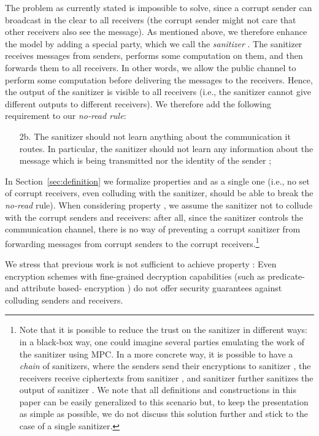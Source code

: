 \documentclass{llncs}
\begin{document}
The problem as currently stated is impossible to solve, since a corrupt sender can broadcast  in the clear to all receivers (the corrupt sender might not care that other receivers also see the message). As mentioned above, we therefore enhance the model by adding a special party, which we call the \emph{sanitizer} . The sanitizer receives messages from senders, performs some computation on them, and then forwards them to all receivers. 
In other words, we allow the public channel to perform some computation before delivering the messages to the receivers. Hence, the output of the sanitizer is visible to all receivers (i.e., the sanitizer cannot give different outputs to different receivers). 
We therefore add the following requirement to our \emph{no-read rule}:
\begin{enumerate}
\item[2b.] The sanitizer should not learn anything about the communication it routes. In particular, the sanitizer should not learn any information about the message  which is being transmitted nor the identity of the sender ; 
\end{enumerate}

In Section~\ref{sec:definition} we formalize properties  and  as a single one (i.e., no set of corrupt receivers, even colluding with the sanitizer, should be able to break the \emph{no-read} rule). When considering property , we assume the sanitizer not to collude with the corrupt senders and receivers: after all, since the sanitizer controls the communication channel, there is no way of preventing a corrupt sanitizer from forwarding messages from corrupt senders to the corrupt receivers.\footnote{Note that it is possible to reduce the trust on the sanitizer in different ways: in a black-box way, one could imagine several parties emulating the work of the sanitizer using MPC. In a more concrete way, it is possible to have a \emph{chain} of sanitizers, where the senders send their encryptions to sanitizer , the receivers receive ciphertexts from sanitizer , and sanitizer  further sanitizes the output of sanitizer . We note that all definitions and constructions in this paper can be easily generalized to this scenario but, to keep the presentation as simple as possible, we do not discuss this solution further and stick to the case of a single sanitizer.}

We stress that previous work is not sufficient to achieve property : Even encryption schemes with fine-grained decryption capabilities (such as predicate- and attribute based- encryption \cite{DBLP:conf/ccs/GoyalPSW06,DBLP:journals/joc/KatzSW13}) do not offer security guarantees against colluding senders and receivers. 
\end{document}
